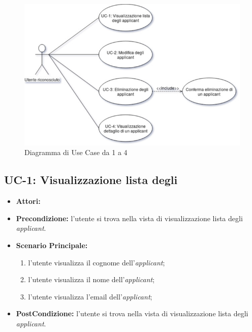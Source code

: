 \vspace{0.5em}
\begin{figure}[!h] 
	\centering 
	\includegraphics[width=1\columnwidth]{immagini/usecase/UC1} 
	\caption{Diagramma di Use Case da 1 a 4}
	\label{figura:uc-1}
\end{figure}


\subsection{UC-1: Visualizzazione lista degli\applicant}
\begin{itemize}
	\item \textbf{Attori:}\loggedusr
	\item \textbf{Precondizione:} l'utente si trova nella vista di visualizzazione lista degli \textit{applicant}.
	\item \textbf{Scenario Principale:} 
		\begin{enumerate}
			\item l'utente visualizza il cognome dell'\textit{applicant}; 
			\item l'utente visualizza il nome dell'\textit{applicant};
			\item l'utente visualizza l'email dell'\textit{applicant};
		\end{enumerate}
	\item \textbf{PostCondizione:} l'utente si trova nella vista di visualizzazione lista degli \textit{applicant}.
\end{itemize}

